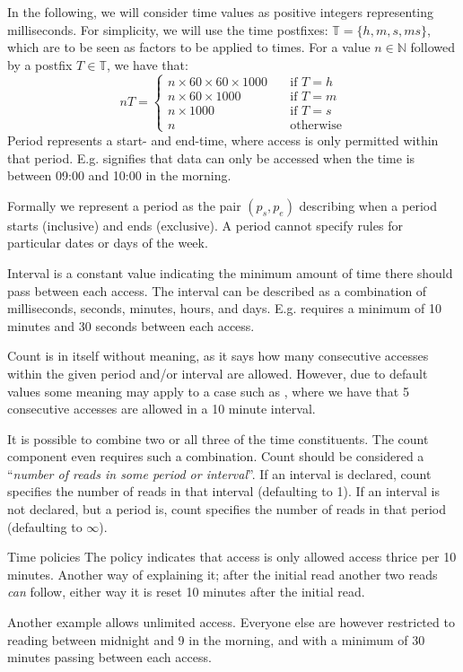 In the following, we will consider time values as positive integers representing milliseconds.
For simplicity, we will use the time postfixes: $\mathbb{T} = \{ h, m, s, ms \}$, which are to be seen as factors to be applied to times.
For a value $n \in \mathbb{N}$ followed by a postfix $T \in \mathbb{T}$, we have that:
\[nT = \begin{cases}
  n \times 60 \times 60 \times 1000 & \quad\text{if } T = h \\
  n \times 60 \times 1000 & \quad\text{if } T = m \\
  n \times 1000 & \quad\text{if } T = s \\
  n & \quad\text{otherwise}
\end{cases}\]
Period represents a start- and end-time, where access is only permitted within that period.
E.g.  signifies that data can only be accessed when the time is between 09:00 and 10:00 in the morning.

Formally we represent a period as the pair $(p_s, p_e)$ describing when a period starts (inclusive) and ends (exclusive).
A period cannot specify rules for particular dates or days of the week.

Interval is a constant value indicating the minimum amount of time there should pass between each access.
The interval can be described as a combination of milliseconds, seconds, minutes, hours, and days.
E.g.  requires a minimum of 10 minutes and 30 seconds between each access.

Count is in itself without meaning, as it says how many consecutive accesses within the given period and/or interval are allowed.
However, due to default values some meaning may apply to a case such as , where we have that 5 consecutive accesses are allowed in a 10 minute interval.

It is possible to combine two or all three of the time constituents.
The count component even requires such a combination.
Count should be considered a ``\textit{number of reads in some period or interval}''.
If an interval is declared, count specifies the number of reads in that interval (defaulting to 1).
If an interval is not declared, but a period is, count specifies the number of reads in that period (defaulting to $\infty$).

\begin{example}{Time policies}
  The  policy indicates that access is only allowed access thrice per 10 minutes.
  Another way of explaining it; after the initial read another two reads \emph{can} follow, either way it is reset 10 minutes after the initial read.

  Another example  allows  unlimited access.
  Everyone else are however restricted to reading between midnight and 9 in the morning, and with a minimum of 30 minutes passing between each access.
\end{example}

